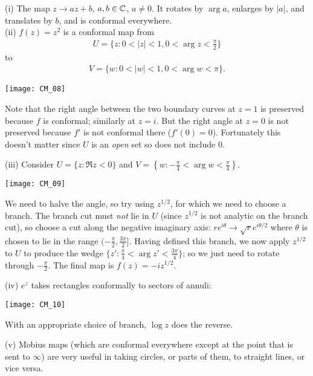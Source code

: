 \documentclass[a4paper]{article}
\begin{document}
\begin{eg}
(i) The map $z \to az + b$, $a,b \in \mathbb{C}$, $a \neq 0$. It rotates by $\arg a$, enlarges by $|a|$, and translates by $b$, and is conformal everywhere.\\
(ii) $f(z) = z^2$ is a conformal map from
\begin{equation*}
\begin{aligned}
U = \{z:0<|z|<1,0<\arg z < \frac{\pi}{2}\}
\end{aligned}
\end{equation*}
to
\begin{equation*}
\begin{aligned}
V = \{w: 0 < |w| < 1, 0 < \arg w < \pi\}.
\end{aligned}
\end{equation*}

\texttt{[image: CM\_08]}

Note that the right angle between the two boundary curves at $z=1$ is preserved because $f$ is conformal; similarly at $z=i$. But the right angle at $z=0$ is not preserved because $f'$ is not conformal there ($f'(0) = 0$). Fortunately this doesn't matter since $U$ is an \emph{open} set so does not include $0$.

(iii) Consider $U=\{z:\Re z<0\}$ and $V=\left\{w:-\frac{\pi}{4} < \arg w < \frac{\pi}{4} \right\}$.

\texttt{[image: CM\_09]}

We need to halve the angle, so try using $z^{1/2}$, for which we need to choose a branch. The branch cut must \emph{not} lie in $U$ (since $z^{1/2}$ is not analytic on the branch cut), so choose a cut along the negative imaginary axis: $re^{i\theta} \to \sqrt{r} e^{i\theta/2}$ where $\theta$ is chosen to lie in the range $(-\frac{\pi}{2},\frac{3\pi}{2}]$. Having defined this branch, we now apply $z^{1/2}$ to $U$ to produce the wedge $\{z':\frac{\pi}{4} < \arg z' < \frac{3\pi}{4}\}$; so we just need to rotate through $-\frac{\pi}{2}$. The final map is $f(z) = -iz^{1/2}$.

(iv) $e^z$ takes rectangles conformally to sectors of annuli:

\texttt{[image: CM\_10]}

With an appropriate choice of branch, $\log z$ does the reverse.

(v) M$\ddot{o}$bius maps (which are conformal everywhere except at the point that is sent to $\infty$) are very useful in taking circles, or parts of them, to straight lines, or vice versa.


\end{eg}
\end{document}
